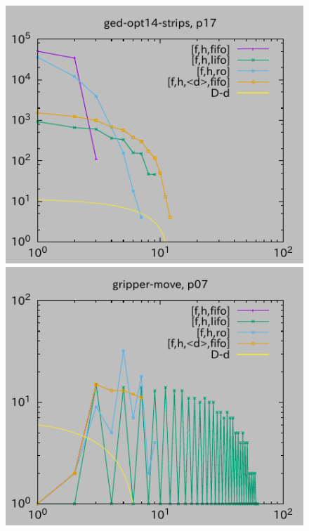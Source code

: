 \begin{figure}[tb]
\includegraphics{img/depth/ged-opt14-strips/p17.pdf}
\includegraphics{img/depth/gripper-move/p07.pdf}

\end{figure}
